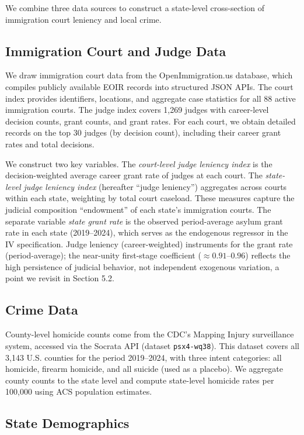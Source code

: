\documentclass[12pt]{article}
\begin{document}
We combine three data sources to construct a state-level cross-section of immigration court leniency and local crime.

\subsection{Immigration Court and Judge Data}

We draw immigration court data from the OpenImmigration.us database, which compiles publicly available EOIR records into structured JSON APIs. The court index provides identifiers, locations, and aggregate case statistics for all 88 active immigration courts. The judge index covers 1,269 judges with career-level decision counts, grant counts, and grant rates. For each court, we obtain detailed records on the top 30 judges (by decision count), including their career grant rates and total decisions.

We construct two key variables. The \textit{court-level judge leniency index} is the decision-weighted average career grant rate of judges at each court. The \textit{state-level judge leniency index} (hereafter ``judge leniency'') aggregates across courts within each state, weighting by total court caseload. These measures capture the judicial composition ``endowment'' of each state's immigration courts. The separate variable \textit{state grant rate} is the observed period-average asylum grant rate in each state (2019--2024), which serves as the endogenous regressor in the IV specification. Judge leniency (career-weighted) instruments for the grant rate (period-average); the near-unity first-stage coefficient ($\approx 0.91$--$0.96$) reflects the high persistence of judicial behavior, not independent exogenous variation, a point we revisit in Section 5.2.

\subsection{Crime Data}

County-level homicide counts come from the CDC's Mapping Injury surveillance system, accessed via the Socrata API (dataset \texttt{psx4-wq38}). This dataset covers all 3,143 U.S. counties for the period 2019--2024, with three intent categories: all homicide, firearm homicide, and all suicide (used as a placebo). We aggregate county counts to the state level and compute state-level homicide rates per 100,000 using ACS population estimates.

\subsection{State Demographics}
\end{document}
